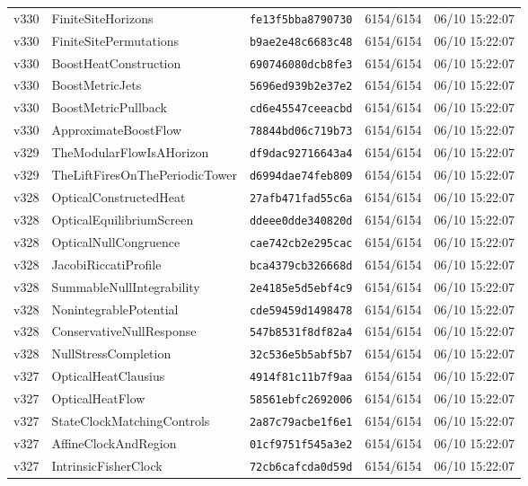 \documentclass[11pt]{article}
\theoremstyle{definition}\newtheorem{deriv}{Derivação}
\begin{document}
{\begin{longtable}{@{}lllll@{}}
v330 & FiniteSiteHorizons & \texttt{fe13f5bba8790730} & 6154/6154 & 06/10 15:22:07 \\
v330 & FiniteSitePermutations & \texttt{b9ae2e48c6683c48} & 6154/6154 & 06/10 15:22:07 \\
v330 & BoostHeatConstruction & \texttt{690746080dcb8fe3} & 6154/6154 & 06/10 15:22:07 \\
v330 & BoostMetricJets & \texttt{5696ed939b2e37e2} & 6154/6154 & 06/10 15:22:07 \\
v330 & BoostMetricPullback & \texttt{cd6e45547ceeacbd} & 6154/6154 & 06/10 15:22:07 \\
v330 & ApproximateBoostFlow & \texttt{78844bd06c719b73} & 6154/6154 & 06/10 15:22:07 \\
v329 & TheModularFlowIsAHorizon & \texttt{df9dac92716643a4} & 6154/6154 & 06/10 15:22:07 \\
v329 & TheLiftFiresOnThePeriodicTower & \texttt{d6994dae74feb809} & 6154/6154 & 06/10 15:22:07 \\
v328 & OpticalConstructedHeat & \texttt{27afb471fad55c6a} & 6154/6154 & 06/10 15:22:07 \\
v328 & OpticalEquilibriumScreen & \texttt{ddeee0dde340820d} & 6154/6154 & 06/10 15:22:07 \\
v328 & OpticalNullCongruence & \texttt{cae742cb2e295cac} & 6154/6154 & 06/10 15:22:07 \\
v328 & JacobiRiccatiProfile & \texttt{bca4379cb326668d} & 6154/6154 & 06/10 15:22:07 \\
v328 & SummableNullIntegrability & \texttt{2e4185e5d5ebf4c9} & 6154/6154 & 06/10 15:22:07 \\
v328 & NonintegrablePotential & \texttt{cde59459d1498478} & 6154/6154 & 06/10 15:22:07 \\
v328 & ConservativeNullResponse & \texttt{547b8531f8df82a4} & 6154/6154 & 06/10 15:22:07 \\
v328 & NullStressCompletion & \texttt{32c536e5b5abf5b7} & 6154/6154 & 06/10 15:22:07 \\
v327 & OpticalHeatClausius & \texttt{4914f81c11b7f9aa} & 6154/6154 & 06/10 15:22:07 \\
v327 & OpticalHeatFlow & \texttt{58561ebfc2692006} & 6154/6154 & 06/10 15:22:07 \\
v327 & StateClockMatchingControls & \texttt{2a87c79acbe1f6e1} & 6154/6154 & 06/10 15:22:07 \\
v327 & AffineClockAndRegion & \texttt{01cf9751f545a3e2} & 6154/6154 & 06/10 15:22:07 \\
v327 & IntrinsicFisherClock & \texttt{72cb6cafcda0d59d} & 6154/6154 & 06/10 15:22:07 \\

\end{longtable}}
\end{document}
